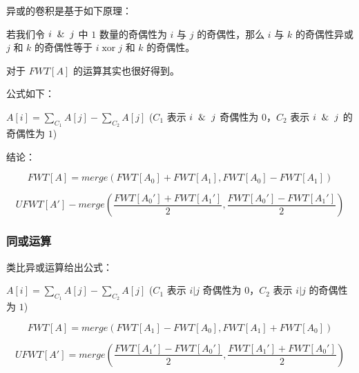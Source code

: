 异或的卷积是基于如下原理：

若我们令 $i\And j$ 中 $1$ 数量的奇偶性为 $i$ 与 $j$ 的奇偶性，那么 $i$ 与 $k$ 的奇偶性异或 $j$ 和 $k$ 的奇偶性等于 $i \operatorname{xor} j$ 和 $k$ 的奇偶性。

对于 $FWT[A]$ 的运算其实也很好得到。

公式如下：

$A[i] = \sum_{C_1}A[j] - \sum_{C_2}A[j]$ ($C_1$ 表示 $i \And j$ 奇偶性为 $0$，$C_2$ 表示 $i \And j$ 的奇偶性为 $1$)

结论：

$$
FWT[A] = merge(FWT[A_0] + FWT[A_1], FWT[A_0] - FWT[A_1])
$$

$$
UFWT[A'] - merge(\frac{FWT[A_0'] + FWT[A_1']}{2}, \frac{FWT[A_0'] - FWT[A_1']}{2})
$$

\subsubsection{同或运算}

类比异或运算给出公式：

$A[i] = \sum_{C_1}A[j] - \sum_{C_2}A[j]$ ($C_1$ 表示 $i|j$ 奇偶性为 $0$，$C_2$ 表示 $i|j$ 的奇偶性为 $1$)

$$
FWT[A] = merge(FWT[A_1] - FWT[A_0], FWT[A_1] + FWT[A_0])
$$

$$
UFWT[A'] = merge(\frac{FWT[A_1'] - FWT[A_0']}{2}, \frac{FWT[A_1'] + FWT[A_0']}{2})
$$
